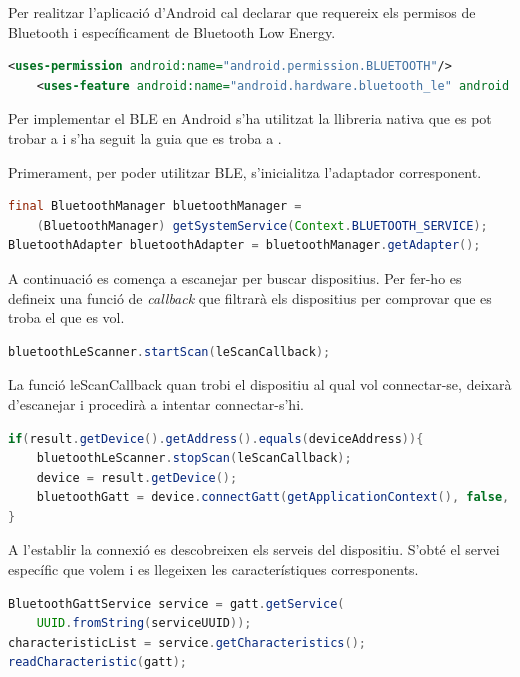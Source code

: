 Per realitzar l'aplicació d'Android cal declarar que requereix els permisos de Bluetooth i específicament de Bluetooth Low Energy.

\begin{lstlisting}[language=xml]
	<uses-permission android:name="android.permission.BLUETOOTH"/>
	<uses-feature android:name="android.hardware.bluetooth_le" android:required="true"/>
\end{lstlisting}

Per implementar el BLE en Android s'ha utilitzat la llibreria nativa que es pot trobar a \cite{ble_library} i s'ha seguit la guia que es troba a \cite{ble_overview}.

Primerament, per poder utilitzar BLE, s'inicialitza l'adaptador corresponent.

\begin{lstlisting}[language=java]
final BluetoothManager bluetoothManager =
	(BluetoothManager) getSystemService(Context.BLUETOOTH_SERVICE);
BluetoothAdapter bluetoothAdapter = bluetoothManager.getAdapter();
\end{lstlisting}

A continuació es comença a escanejar per buscar dispositius.
Per fer-ho es defineix una funció de \textit{callback} que filtrarà els dispositius per comprovar que es troba el que es vol.

\begin{lstlisting}[language=java]
bluetoothLeScanner.startScan(leScanCallback);
\end{lstlisting}

La funció leScanCallback quan trobi el dispositiu al qual vol connectar-se, deixarà d'escanejar i procedirà a intentar connectar-s'hi.
\begin{lstlisting}[language=java]
if(result.getDevice().getAddress().equals(deviceAddress)){
	bluetoothLeScanner.stopScan(leScanCallback);
	device = result.getDevice();
	bluetoothGatt = device.connectGatt(getApplicationContext(), false, gattCallback);
}
\end{lstlisting}

A l'establir la connexió es descobreixen els serveis del dispositiu.
S'obté el servei específic que volem i es llegeixen les característiques corresponents.

\begin{lstlisting}[language=java]
BluetoothGattService service = gatt.getService(
	UUID.fromString(serviceUUID));
characteristicList = service.getCharacteristics();
readCharacteristic(gatt);
\end{lstlisting}

